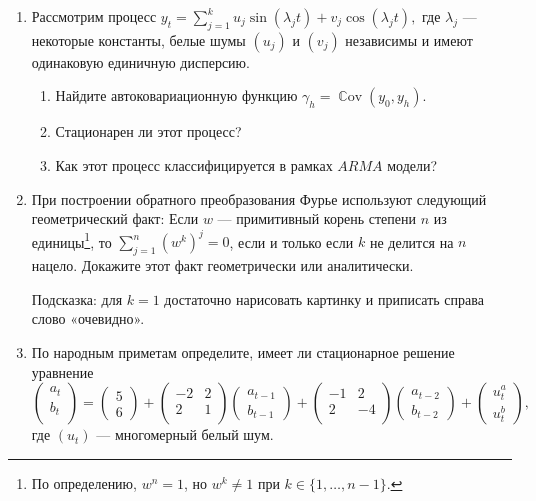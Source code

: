 \documentclass[12pt]{article}
\DeclareMathOperator{\Cov}{\mathbb{C}ov}
\begin{document}

\begin{enumerate}

\item Рассмотрим процесс 
$
    y_t = \sum_{j=1}^k u_j \sin(\lambda_j t) + v_j \cos(\lambda_j t),
$
где $\lambda_j$ — некоторые константы, белые шумы $(u_j)$ и $(v_j)$ независимы и имеют одинаковую единичную дисперсию. 
    
\begin{enumerate}
        \item Найдите автоковариационную функцию $\gamma_h = \Cov(y_0, y_h)$.
        \item Стационарен ли этот процесс? 
        \item Как этот процесс классифицируется в рамках $ARMA$ модели?
\end{enumerate}


\item При построении обратного преобразования Фурье используют следующий геометрический факт:
Если $w$ — примитивный корень степени $n$ из единицы\footnote{По определению, $w^n=1$, но $w^k \neq 1$ при $k \in \{1, \ldots, n-1\}$.},
то $\sum_{j=1}^n (w^k)^j = 0$, если и только если $k$ не делится на $n$ нацело. 
Докажите этот факт геометрически или аналитически. 

Подсказка: для $k=1$ достаточно нарисовать картинку и приписать справа слово «очевидно».

\item По народным приметам определите, имеет ли стационарное решение уравнение
\[
\begin{pmatrix}
    a_t \\
    b_t \\
\end{pmatrix} =
\begin{pmatrix}
    5 \\
    6 
\end{pmatrix}  +
\begin{pmatrix}
    -2 & 2 \\
    2 & 1 \\
\end{pmatrix}
\begin{pmatrix}
    a_{t-1} \\
    b_{t-1}
\end{pmatrix} +
\begin{pmatrix}
    -1 & 2 \\
    2 & -4 \\
\end{pmatrix}
\begin{pmatrix}
    a_{t-2} \\
    b_{t-2}
\end{pmatrix} +
\begin{pmatrix}
    u_t^a \\
    u_t^b
\end{pmatrix},
\]
где $(u_t)$ — многомерный белый шум. 


\end{enumerate}
\end{document}
